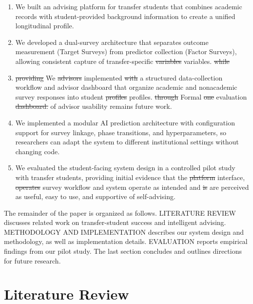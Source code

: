 \documentclass[letterpaper,11pt]{article}
\newcommand{\DIFdel}[1]{%
  \begingroup\setlength{\fboxsep}{0.5pt}%
  \colorbox{diffdelbg}{\textcolor{diffdeltext}{\sout{#1}}}%
  \endgroup}
\newcommand{\DIFadd}[1]{%
  \begingroup\setlength{\fboxsep}{0.5pt}%
  \colorbox{diffaddbg}{\textcolor{diffaddtext}{#1}}%
  \endgroup}
\begin{document}
\begin{enumerate}
    \item We built an advising platform for transfer students that combines academic records with student-provided background information to create a unified longitudinal profile.
    \item We developed a dual-survey architecture that separates outcome measurement (Target Surveys) from predictor collection (Factor Surveys), allowing consistent capture of transfer-specific \DIFdel{variables} \DIFadd{variables.}
    \DIFdel{while} \item \DIFdel{providing} \DIFadd{We} \DIFdel{advisors} \DIFadd{implemented} \DIFdel{with} \DIFadd{a} structured \DIFadd{data-collection} \DIFadd{workflow} \DIFadd{and} \DIFadd{advisor} \DIFadd{dashboard} \DIFadd{that} \DIFadd{organize} \DIFadd{academic} \DIFadd{and} \DIFadd{nonacademic} \DIFadd{survey} \DIFadd{responses} \DIFadd{into} student \DIFdel{profiles} \DIFadd{profiles.} \DIFdel{through} \DIFadd{Formal} \DIFdel{one} \DIFadd{evaluation} \DIFdel{dashboard.} \DIFadd{of} \DIFadd{advisor} \DIFadd{usability} \DIFadd{remains} \DIFadd{future} \DIFadd{work.}
    \item We implemented a modular \DIFadd{AI} prediction architecture with configuration support for survey linkage, phase transitions, and hyperparameters, so researchers can adapt the system to different institutional settings without changing code.
    \item We evaluated the \DIFadd{student-facing} system design in a controlled pilot study with transfer students, providing initial evidence that the \DIFdel{platform} \DIFadd{interface,} \DIFdel{operates} \DIFadd{survey} \DIFadd{workflow} \DIFadd{and} \DIFadd{system} \DIFadd{operate} as intended and \DIFdel{is} \DIFadd{are} perceived as useful, easy to use, and supportive of self-advising.
\end{enumerate}

The remainder of the paper is organized as follows. LITERATURE REVIEW discusses related work on transfer-student success and intelligent advising. METHODOLOGY AND IMPLEMENTATION describes our system design and methodology, as well as implementation details. EVALUATION reports empirical findings from our pilot study. The last section concludes and outlines directions for future research.

\section{Literature Review}\label{sec:literature}
\end{document}
